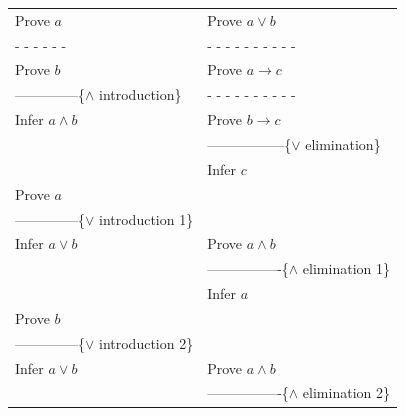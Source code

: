 \begin{figure}
\begin{spacing}{0.9}
\begin{center}
\begin{tabular}{ll}
Prove $a$                                               & Prove $a \vee b$                                  \\
 - - - - - -                                            &  - - - - - - - - - -                              \\
Prove $b$                                               & Prove $a \rightarrow c$                           \\
--------------\{$\wedge$ introduction\}                 &  - - - - - - - - - -                              \\
Infer $a \wedge b$                                      & Prove $b \rightarrow c$                           \\
                                                        & -----------------\{$\vee$ elimination\}           \\
                                                        & Infer $c$                                         \\
Prove $a$                                               &                                                   \\
--------------\{$\vee$ introduction 1\}                 &                                                   \\
Infer $a \vee  b$                                       & Prove $a \wedge b$                                \\
                                                        & ----------------\{$\wedge$ elimination 1\}        \\
                                                        & Infer $a$                                         \\
Prove $b$                                               &                                                   \\
--------------\{$\vee$ introduction 2\}                 &                                                   \\
Infer $a \vee  b$                                       & Prove $a \wedge b$                                \\
                                                        & ----------------\{$\wedge$ elimination 2\}        \\

\end{tabular}
\end{center}
\end{spacing}
\end{figure}

